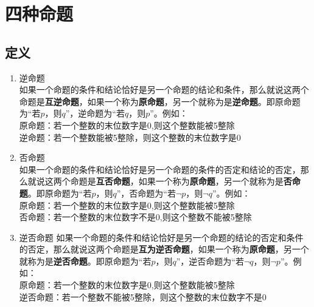 \section*{四种命题}
\subsection*{定义}
    \begin{enumerate}
        \item 逆命题 \\
            如果一个命题的条件和结论恰好是另一个命题的结论和条件，那么就说这两个命题是\textbf{互逆命题}，如果一个称为\textbf{原命题}，另一个就称为是\textbf{逆命题}。即原命题为“若$p$，则$q$”，逆命题为“若$q$，则$p$”。例如：\\
            原命题：若一个整数的末位数字是0,则这个整数能被5整除 \\
            逆命题：若一个整数能被5整除，则这个整数的末位数字是0
        \item 否命题 \\
            如果一个命题的条件和结论恰好是另一个命题的条件的否定和结论的否定，那么就说这两个命题是\textbf{互否命题}，如果一个称为\textbf{原命题}，另一个就称为是\textbf{否命题}。即原命题为“若$p$，则$q$”，否命题为“若$\neg p$，则$\neg q$”。例如：\\
            原命题：若一个整数的末位数字是0,则这个整数能被5整除 \\
            否命题：若一个整数的末位数字不是0,则这个整数不能被5整除
        \item 逆否命题
            如果一个命题的条件和结论恰好是另一个命题的结论的否定和条件的否定，那么就说这两个命题是\textbf{互为逆否命题}，如果一个称为\textbf{原命题}，另一个就称为是\textbf{逆否命题}。即原命题为“若$p$，则$q$”，逆否命题为“若$\neg q$，则$\neg p$”。例如：\\
            原命题：若一个整数的末位数字是0,则这个整数能被5整除 \\
            逆否命题：若一个整数不能被5整除，则这个整数的末位数字不是0
    \end{enumerate}
